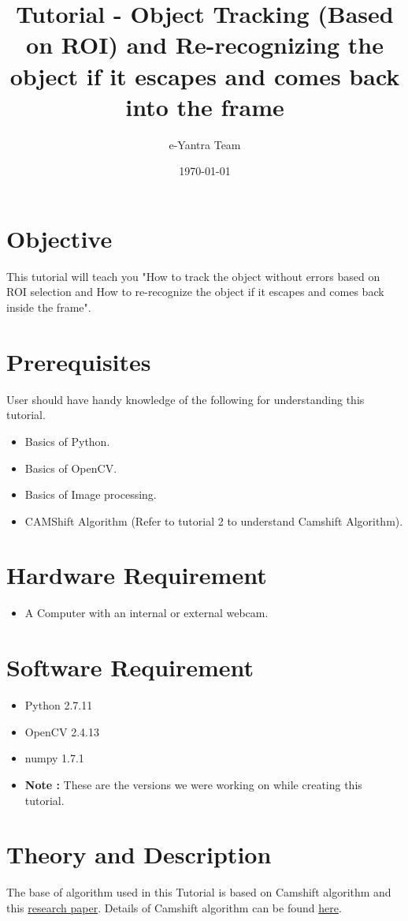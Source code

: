 \documentclass[11pt,a4paper]{article}
\title{Tutorial - Object Tracking (Based on ROI) and Re-recognizing the object if it escapes and comes back into the frame}
\author{e-Yantra Team}
\date{\today}
\begin{document}
	\maketitle
	\newpage
	\tableofcontents
	\newpage
	\section{Objective}
		This tutorial will teach you "How to track the object without errors based on ROI selection and How to re-recognize the object if it escapes and comes back inside the frame".
	\section{Prerequisites}
		User should have handy knowledge of the following for understanding this tutorial.
		\begin{itemize}
			\item Basics of Python.
			\item Basics of OpenCV.
			\item Basics of Image processing.
			\item CAMShift Algorithm (Refer to tutorial 2 to understand Camshift Algorithm).
		\end{itemize}
	\section{Hardware Requirement}
		\begin{itemize}
			\item A Computer with an internal or external webcam.
		\end{itemize}
	\section{Software Requirement}
		\begin{itemize}
			\item Python 2.7.11
			\item OpenCV 2.4.13 
			\item numpy 1.7.1
			\item \textbf{Note :} These are the versions we were working on while creating this tutorial.
		\end{itemize}
	\section{Theory and Description}
		 The base of algorithm used in this Tutorial is based on Camshift algorithm and this \href{http://vgl-ait.org/mdailey/uploads/publication_file/filename/106/Basit-CAMSHIFT.pdf}{research paper}. Details of Camshift algorithm can be found \href{https://github.com/eYSIP-2016/Object-Tracking-Camera/tree/master/Tutorials}{here}.
		 
\end{document}
